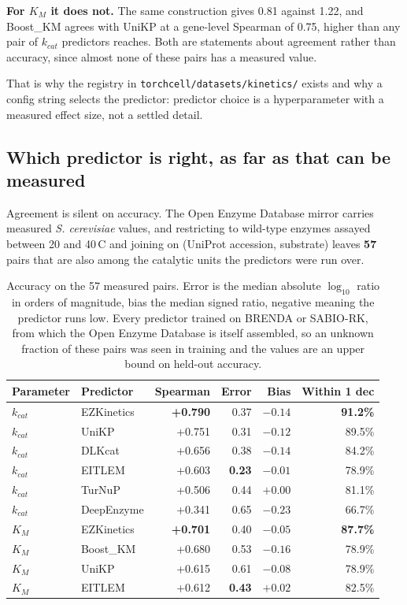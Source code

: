 \textbf{For $K_M$ it does not.} The same construction gives 0.81 against 1.22, and
Boost\_KM agrees with UniKP at a gene-level Spearman of 0.75, higher than any pair of
$k_{cat}$ predictors reaches. Both are statements about agreement rather than accuracy,
since almost none of these pairs has a measured value.

That is why the registry in \texttt{torchcell/datasets/kinetics/} exists and why a config
string selects the predictor: predictor choice is a hyperparameter with a measured effect
size, not a settled detail.

\subsection{Which predictor is right, as far as that can be measured}

Agreement is silent on accuracy. The Open Enzyme Database mirror carries measured
\emph{S. cerevisiae} values, and restricting to wild-type enzymes assayed between 20 and
40\,\textdegree C and joining on (UniProt accession, substrate) leaves \textbf{57} pairs
that are also among the catalytic units the predictors were run over.

\begin{table}[H]
  \centering
  \footnotesize
  \caption[Predictor accuracy against measured values]{Accuracy on the 57 measured pairs.
  Error is the median absolute $\log_{10}$ ratio in orders of magnitude, bias the median signed ratio,
  negative meaning the predictor runs low. Every predictor trained on BRENDA or SABIO-RK,
  from which the Open Enzyme Database is itself assembled, so an unknown fraction of these
  pairs was seen in training and the values are an upper bound on held-out accuracy.}
  \label{tab:accuracy}
  \begin{tabular}{@{}llrrrr@{}}
    \hline
    Parameter & Predictor & Spearman & Error & Bias & Within 1 dec \\
    \hline
    $k_{cat}$ & EZKinetics & \textbf{+0.790} & 0.37 & $-0.14$ & \textbf{91.2\%} \\
    $k_{cat}$ & UniKP & +0.751 & 0.31 & $-0.12$ & 89.5\% \\
    $k_{cat}$ & DLKcat & +0.656 & 0.38 & $-0.14$ & 84.2\% \\
    $k_{cat}$ & EITLEM & +0.603 & \textbf{0.23} & $-0.01$ & 78.9\% \\
    $k_{cat}$ & TurNuP & +0.506 & 0.44 & $+0.00$ & 81.1\% \\
    $k_{cat}$ & DeepEnzyme & +0.341 & 0.65 & $-0.23$ & 66.7\% \\
    \hline
    $K_M$ & EZKinetics & \textbf{+0.701} & 0.40 & $-0.05$ & \textbf{87.7\%} \\
    $K_M$ & Boost\_KM & +0.680 & 0.53 & $-0.16$ & 78.9\% \\
    $K_M$ & UniKP & +0.615 & 0.61 & $-0.08$ & 78.9\% \\
    $K_M$ & EITLEM & +0.612 & \textbf{0.43} & $+0.02$ & 82.5\% \\
    \hline
  \end{tabular}
\end{table}

